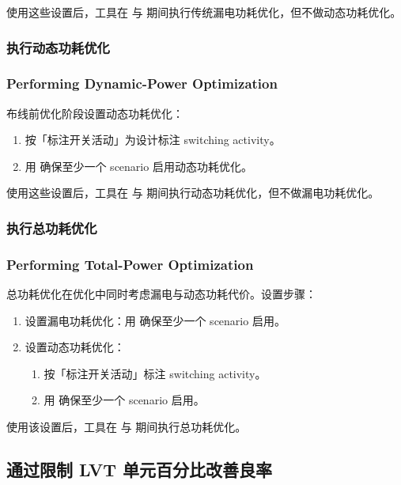 使用这些设置后，工具在  与  期间执行传统漏电功耗优化，但不做动态功耗优化。

\subsubsection{执行动态功耗优化}
\subsubsection*{Performing Dynamic-Power Optimization}

布线前优化阶段设置动态功耗优化：
\begin{enumerate}
  \item 按「标注开关活动」为设计标注 switching activity。
  \item 用  确保至少一个 scenario 启用动态功耗优化。
\end{enumerate}

使用这些设置后，工具在  与  期间执行动态功耗优化，但不做漏电功耗优化。

\subsubsection{执行总功耗优化}
\subsubsection*{Performing Total-Power Optimization}

总功耗优化在优化中同时考虑漏电与动态功耗代价。设置步骤：
\begin{enumerate}
  \item 设置漏电功耗优化：用  确保至少一个 scenario 启用。
  \item 设置动态功耗优化：
        \begin{enumerate}
          \item 按「标注开关活动」标注 switching activity。
          \item 用  确保至少一个 scenario 启用。
        \end{enumerate}
\end{enumerate}

使用该设置后，工具在  与  期间执行总功耗优化。

\subsection{通过限制 LVT 单元百分比改善良率}
